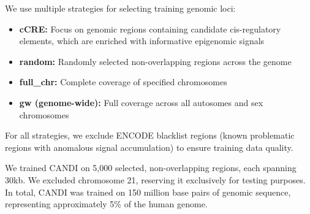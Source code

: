 We use multiple strategies for selecting training genomic loci:
\begin{itemize}
    \item \textbf{cCRE:} Focus on genomic regions containing candidate cis-regulatory elements, which are enriched with informative epigenomic signals \cite{encode2020expanded}
    \item \textbf{random:} Randomly selected non-overlapping regions across the genome
    \item \textbf{full\_chr:} Complete coverage of specified chromosomes
    \item \textbf{gw (genome-wide):} Full coverage across all autosomes and sex chromosomes
\end{itemize}

For all strategies, we exclude ENCODE blacklist regions (known problematic regions with anomalous signal accumulation) to ensure training data quality.

We trained CANDI on 5,000  selected, non-overlapping regions, each spanning 30kb. We excluded chromosome 21, reserving it exclusively for testing purposes. In total, CANDI was trained on 150 million base pairs of genomic sequence, representing approximately 5\% of the human genome.




